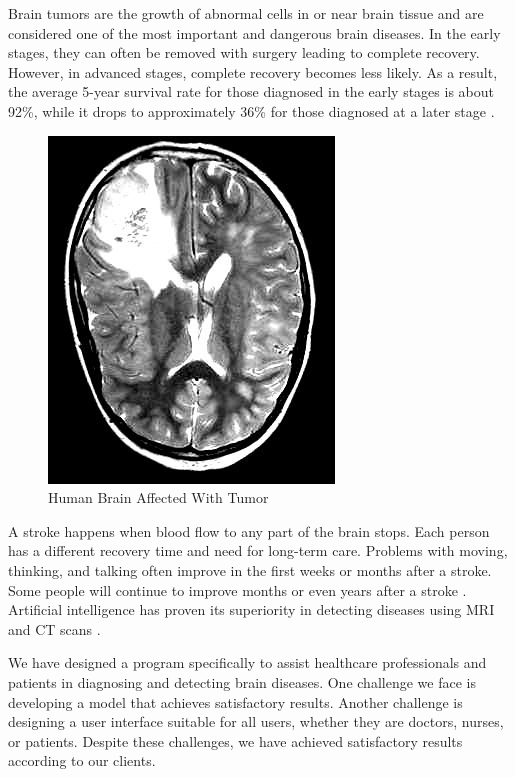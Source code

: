 \documentclass[conference]{IEEEtran}
\begin{document}
Brain tumors are the growth of abnormal cells in or near brain tissue and are considered one of the most important and dangerous brain diseases. In the early stages, they can often be removed with surgery leading to complete recovery. However, in advanced stages, complete recovery becomes less likely. As a result, the average 5-year survival rate for those diagnosed in the early stages is about 92\%, while it drops to approximately 36\% for those diagnosed at a later stage \cite{Kang2023, kang2023bgfyolo}.

\begin{figure}
    \centering
    \includegraphics[scale=0.5]{figures/brain_with_tumor.jpg}
    \caption{Human Brain Affected With Tumor \cite{br35h}}
    \label{fig:brain_with_tumor}
\end{figure}

A stroke happens when blood flow to any part of the brain stops. Each person has a different recovery time and need for long-term care. Problems with moving, thinking, and talking often improve in the first weeks or months after a stroke. Some people will continue to improve months or even years after a stroke \cite{jocher2022yolo5, iandola2014densenet}. Artificial intelligence has proven its superiority in detecting diseases using MRI and CT scans \cite{ABDELMAKSOUD201571-51, chen791-53}.

We have designed a program specifically to assist healthcare professionals and patients in diagnosing and detecting brain diseases. One challenge we face is developing a model that achieves satisfactory results. Another challenge is designing a user interface suitable for all users, whether they are doctors, nurses, or patients. Despite these challenges, we have achieved satisfactory results according to our clients.
\end{document}
